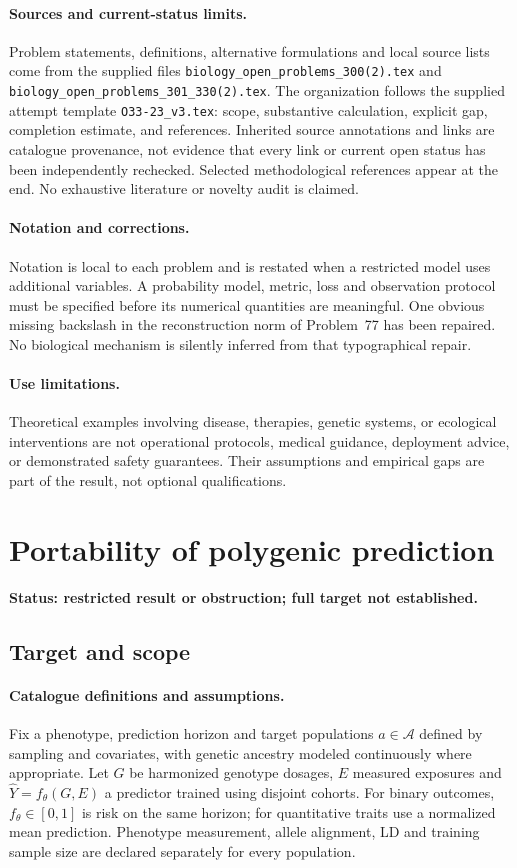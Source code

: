 \documentclass[11pt]{article}
\begin{document}
\paragraph{Sources and current-status limits.}
Problem statements, definitions, alternative formulations and local source lists
come from the supplied files
\texttt{biology\_open\_problems\_300(2).tex} and
\texttt{biology\_open\_problems\_301\_330(2).tex}.
The organization follows the supplied attempt template
\texttt{O33-23\_v3.tex}: scope, substantive calculation, explicit gap,
completion estimate, and references. Inherited source annotations and links are
catalogue provenance, not evidence that every link or current open status has
been independently rechecked. Selected methodological references appear at the
end. No exhaustive literature or novelty audit is claimed.

\paragraph{Notation and corrections.}
Notation is local to each problem and is restated when a restricted model uses
additional variables. A probability model, metric, loss and observation protocol
must be specified before its numerical quantities are meaningful. One obvious
missing backslash in the reconstruction norm of Problem~77 has been repaired.
No biological mechanism is silently inferred from that typographical repair.

\paragraph{Use limitations.}
Theoretical examples involving disease, therapies, genetic systems, or ecological
interventions are not operational protocols, medical guidance, deployment advice,
or demonstrated safety guarantees. Their assumptions and empirical gaps are part
of the result, not optional qualifications.


\section*{Portability of polygenic prediction}
\label{prob:028}
\noindent\textbf{Status: restricted result or obstruction; full target not established.}
\subsection{Target and scope}
\paragraph{Catalogue definitions and assumptions.}
Fix a phenotype, prediction horizon and target populations $a\in\mathcal A$ defined by sampling and covariates, with genetic ancestry modeled continuously where appropriate. Let $G$ be harmonized genotype dosages, $E$ measured exposures and $\widehat Y=f_\theta(G,E)$ a predictor trained using disjoint cohorts. For binary outcomes, $f_\theta\in[0,1]$ is risk on the same horizon; for quantitative traits use a normalized mean prediction. Phenotype measurement, allele alignment, LD and training sample size are declared separately for every population.
\end{document}
